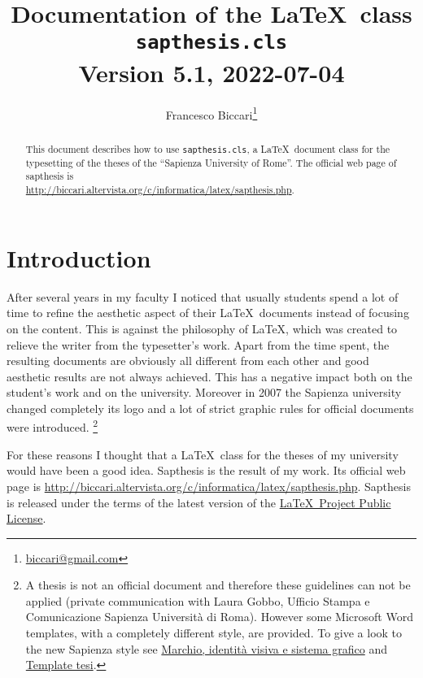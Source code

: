 \documentclass[a5paper,12pt]{article}
\author{\small Francesco Biccari\thanks{\href{mailto:biccari@gmail.com}{biccari@gmail.com}}}
\title{\small Documentation of the \LaTeX\ class\\
		\Large \textbf{\texttt{sapthesis.cls}}\\
		\small \vspace{0.2cm} Version 5.1, 2022-07-04
}
\date{}
\begin{document}
\maketitle

\begin{abstract}\noindent
This document describes how to use \texttt{sapthesis.cls}, a \LaTeX\ document class for the typesetting of the theses of the ``Sapienza University of Rome''. The official web page of \textsf{sapthesis} is\\
{\footnotesize\url{http://biccari.altervista.org/c/informatica/latex/sapthesis.php}}.
\end{abstract}

\setcounter{tocdepth}{2}
\renewcommand{\columnseprule}{0.4pt}
\setlength{\columnsep}{1.5cm}

{\small
\tableofcontents}

\clearpage

\section{Introduction}

After several years in my faculty I noticed that usually students spend a lot of time to refine the aesthetic aspect of their \LaTeX\ documents instead of focusing on the content.
This is against the philosophy of \LaTeX, which was created to relieve the writer from the typesetter's work.
Apart from the time spent, the resulting documents are obviously all different from each other and good aesthetic results are not always achieved.
This has a negative impact both on the student's work and on the university.
Moreover in 2007 the Sapienza university changed completely its
logo and a lot of strict graphic rules for official documents were introduced.%
\footnote{A thesis is not an official document and therefore these guidelines can not be applied (private communication with Laura Gobbo, Ufficio Stampa e Comunicazione Sapienza  Universit\`a di Roma).
However some Microsoft Word templates, with a completely different style, are provided.
To give a look to the new Sapienza style see 
\href{https://www.uniroma1.it/it/pagina/marchio-identita-visiva-e-sistema-grafico}{Marchio, identità visiva e sistema grafico} and \href{https://www.uniroma1.it/it/pagina/impaginazione-della-tesi-e-logo}{Template tesi}.}

For these reasons I thought that a \LaTeX\ class for the theses of my 
university would have been a good idea.
\textsf{Sapthesis} is the result of my work.
Its official web page is
{\footnotesize\url{http://biccari.altervista.org/c/informatica/latex/sapthesis.php}}.
\textsf{Sapthesis} is released under the terms of the latest version of the 
\href{http://www.latex-project.org/lppl/}{\LaTeX\ Project Public License}.
\end{document}
